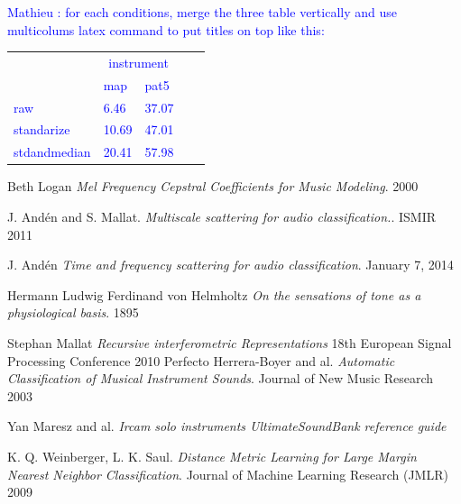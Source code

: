 \documentclass[hidelinks,12pt]{report}
\newcommand{\ml}[1]{\textcolor{blue}{ Mathieu : #1}}
\begin{document}
\ml{for each conditions, merge the three table vertically and use multicolums latex command to put titles on top like this:
\begin{tabular}{ l l | l | l | l | }
 & \multicolumn{2}{c}{instrument}  \\ 
 & map & pat5  \\ 
\hline 
raw &  6.46 & 37.07  \\ 
standarize & 10.69 & 47.01  \\ 
stdandmedian & 20.41 & 57.98  \\ 
\end{tabular}
}

\newpage
\begin{thebibliography}{2}
Beth Logan
\textit{Mel Frequency Cepstral Coefficients for Music Modeling}. 
2000

J. Andén and S. Mallat. 
\textit{Multiscale scattering for audio classification.}. 
ISMIR 2011

J. Andén 
\textit{Time and frequency scattering for audio classification}. 
January 7, 2014

Hermann Ludwig Ferdinand von Helmholtz
\textit{On the sensations of tone as a physiological basis}.
1895

Stephan Mallat 
\textit{Recursive interferometric Representations}  18th European Signal Processing Conference 2010
Perfecto Herrera-Boyer and al.
\textit{Automatic Classification of Musical Instrument Sounds}.
Journal of New Music Research 2003


Yan Maresz and al.
\textit{Ircam solo instruments UltimateSoundBank reference guide}

K. Q. Weinberger, L. K. Saul. 
\textit{Distance Metric Learning for Large Margin Nearest Neighbor Classification}.
Journal of Machine Learning Research (JMLR) 2009



\end{thebibliography}
\end{document}
